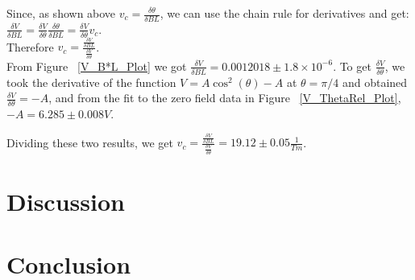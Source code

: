 \documentclass[prb,preprint]{revtex4-1}
\begin{document}
Since, as shown above $v_c = \frac{\delta \theta}{\delta BL}$, we can use the chain rule for derivatives and get: 
\\
$\frac{\delta V}{\delta BL} = \frac{\delta V}{\delta \theta} \frac{\delta \theta}{\delta BL} = \frac{\delta V}{\delta \theta} v_c$.  
\\
Therefore $v_c = \frac{\frac{\delta V}{\delta BL}}{\frac{\delta V}{\delta \theta}}$.
\\
From Figure ~\ref{V_B*L_Plot} we got $\frac{\delta V}{\delta BL} = 0.0012018 \pm 1.8 \times 10^{-6}$. To get $\frac{\delta V}{\delta \theta}$, we took the derivative of the function $V = A \cos^{2}(\theta) - A$ at $\theta = \pi/4$ and obtained $\frac{\delta V}{\delta \theta} = -A$, and from the fit to the zero field data in Figure ~\ref{V_ThetaRel_Plot}, $-A = 6.285 \pm 0.008 V$.  

Dividing these two results, we get $v_c = \frac{\frac{\delta V}{\delta BL}}{\frac{\delta V}{\delta \theta}} = 19.12 \pm 0.05 \frac{1}{Tm}$.  





\section{Discussion}

\section{Conclusion}
\end{document}
